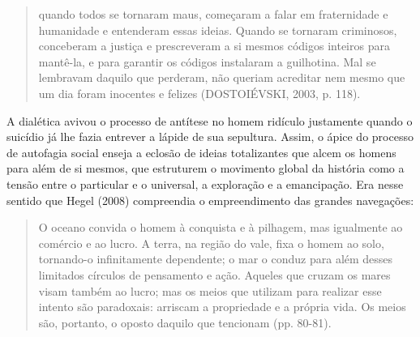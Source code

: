 \begin{quote}
quando todos se tornaram maus, começaram a falar em fraternidade e
humanidade e entenderam essas ideias. Quando se tornaram criminosos,
conceberam a justiça e prescreveram a si mesmos códigos inteiros para
mantê-la, e para garantir os códigos instalaram a guilhotina. Mal se
lembravam daquilo que perderam, não queriam acreditar nem mesmo que um
dia foram inocentes e felizes (DOSTOIÉVSKI, 2003, p. 118).
\end{quote}

A dialética avivou o processo de antítese no homem ridículo justamente
quando o suicídio já lhe fazia entrever a lápide de sua sepultura.
Assim, o ápice do processo de autofagia social enseja a eclosão de
ideias totalizantes que alcem os homens para além de si mesmos, que
estruturem o movimento global da história como a tensão entre o
particular e o universal, a exploração e a emancipação. Era nesse
sentido que Hegel (2008) compreendia o empreendimento das grandes
navegações:

\begin{quote}
O oceano convida o homem à conquista e à pilhagem, mas igualmente ao
comércio e ao lucro. A terra, na região do vale, fixa o homem ao solo,
tornando-o infinitamente dependente; o mar o conduz para além desses
limitados círculos de pensamento e ação. Aqueles que cruzam os mares
visam também ao lucro; mas os meios que utilizam para realizar esse
intento são paradoxais: arriscam a propriedade e a própria vida. Os
meios são, portanto, o oposto daquilo que tencionam (pp. 80-81).
\end{quote}

